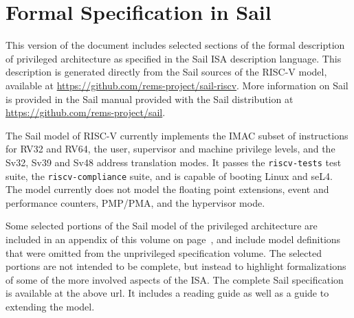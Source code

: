 \section{Formal Specification in Sail}
\label{sect:priv-sail-model}

This version of the document includes selected sections of the formal
description of privileged architecture as specified in the Sail ISA
description language\cite{sail-site}.  This description is generated
directly from the Sail sources of the RISC-V model, available at
\url{https://github.com/rems-project/sail-riscv}.  More information on
Sail is provided in the Sail manual provided with the Sail
distribution at \url{https://github.com/rems-project/sail}.

The Sail model of RISC-V currently implements the IMAC subset of
instructions for RV32 and RV64, the user, supervisor and machine
privilege levels, and the Sv32, Sv39 and Sv48 address translation
modes.  It passes the \texttt{riscv-tests} test suite, the
\texttt{riscv-compliance} suite, and is capable of booting Linux and
seL4.  The model currently does not model the floating point
extensions, event and performance counters, PMP/PMA, and the
hypervisor mode.

Some selected portions of the Sail model of the privileged
architecture are included in an appendix of this volume on
page~\pageref{chap:priv-sail-model}, and include model definitions
that were omitted from the unprivileged specification volume.  The
selected portions are not intended to be complete, but instead to
highlight formalizations of some of the more involved aspects of the
ISA.  The complete Sail specification is available at the above url.
It includes a reading guide as well as a guide to extending the model.
